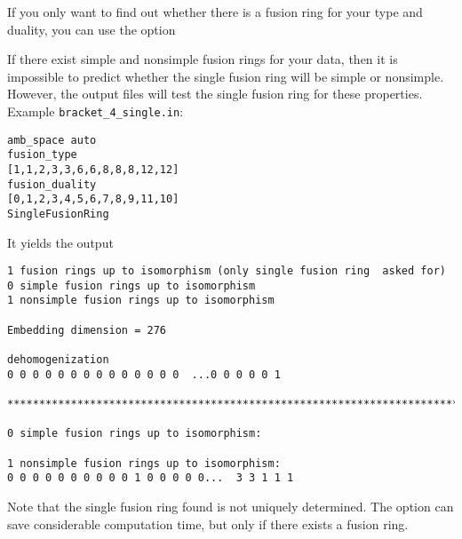 If you only want to find out whether there is a fusion ring for your type and duality, you can use the option
\begin{itemize}
	\itemtt[SingleFusionRing]
\end{itemize}
If there exist simple and nonsimple fusion rings for your data, then it is impossible to predict whether the single fusion ring will be simple or nonsimple. However, the output files will test the single fusion ring for these properties. Example \verb*|bracket_4_single.in|:
\begin{Verbatim}
amb_space auto
fusion_type
[1,1,2,3,3,6,6,8,8,8,12,12]
fusion_duality
[0,1,2,3,4,5,6,7,8,9,11,10]
SingleFusionRing
\end{Verbatim}
It yields the output

\begin{Verbatim}
1 fusion rings up to isomorphism (only single fusion ring  asked for)
0 simple fusion rings up to isomorphism
1 nonsimple fusion rings up to isomorphism

Embedding dimension = 276

dehomogenization
0 0 0 0 0 0 0 0 0 0 0 0 0 0  ...0 0 0 0 0 1 

***********************************************************************

0 simple fusion rings up to isomorphism:

1 nonsimple fusion rings up to isomorphism:
0 0 0 0 0 0 0 0 0 0 1 0 0 0 0 0...  3 3 1 1 1
\end{Verbatim}
Note that the single fusion ring found is not uniquely determined. The option can save considerable computation time, but only if there exists a fusion ring.

